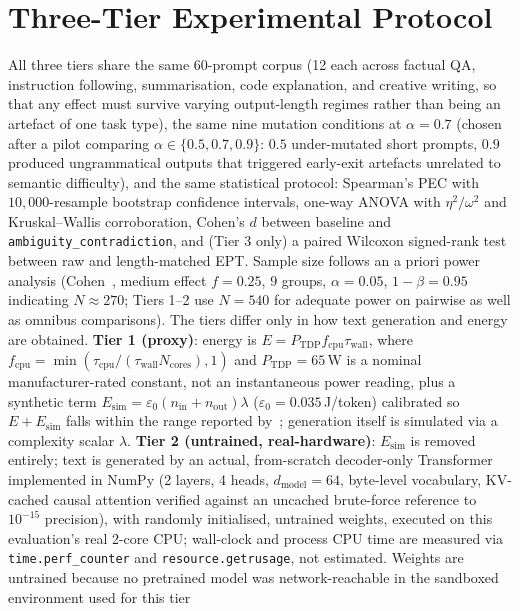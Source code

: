 \documentclass[conference]{IEEEtran}
\begin{document}
\section{Three-Tier Experimental Protocol}
\label{sec:protocol}
All three tiers share the same 60-prompt corpus (12 each across
factual QA, instruction following, summarisation, code explanation,
and creative writing, so that any effect must survive varying
output-length regimes rather than being an artefact of one task type),
the same nine mutation conditions at $\alpha=0.7$ (chosen after a
pilot comparing $\alpha\in\{0.5,0.7,0.9\}$: $0.5$ under-mutated short
prompts, $0.9$ produced ungrammatical outputs that triggered early-exit
artefacts unrelated to semantic difficulty), and the same statistical
protocol: Spearman's PEC with $10{,}000$-resample bootstrap confidence
intervals, one-way ANOVA with $\eta^2/\omega^2$ and Kruskal--Wallis
corroboration, Cohen's $d$ between baseline and
\texttt{ambiguity\_contradiction}, and (Tier 3 only) a paired Wilcoxon
signed-rank test between raw and length-matched EPT. Sample size
follows an a priori power analysis (Cohen~\cite{cohen1988statistical},
medium effect $f=0.25$, 9 groups, $\alpha=0.05$, $1-\beta=0.95$
indicating $N\approx270$; Tiers 1--2 use $N=540$ for adequate power on
pairwise as well as omnibus comparisons).
The tiers differ only in how text generation and energy are obtained.
\textbf{Tier 1 (proxy)}: energy is $E=P_\text{TDP}f_\text{cpu}
\tau_\text{wall}$, where $f_\text{cpu}=\min(\tau_\text{cpu}/
(\tau_\text{wall}N_\text{cores}),1)$ and $P_\text{TDP}=65$\,W is a
nominal manufacturer-rated constant, not an instantaneous power
reading, plus a synthetic term $E_\text{sim}=\varepsilon_0(n_\text{in}
+n_\text{out})\lambda$ ($\varepsilon_0=0.035$\,J/token) calibrated so
$E+E_\text{sim}$ falls within the range reported
by~\cite{samsi2023words,faiz2024llmcarbon}; generation itself is
simulated via a complexity scalar $\lambda$. \textbf{Tier 2 (untrained,
real-hardware)}: $E_\text{sim}$ is removed entirely; text is generated
by an actual, from-scratch decoder-only Transformer implemented in
NumPy (2 layers, 4 heads, $d_\text{model}=64$, byte-level vocabulary,
KV-cached causal attention verified against an uncached
brute-force reference to $10^{-15}$ precision), with randomly
initialised, untrained weights, executed on this evaluation's real
2-core CPU; wall-clock and process CPU time are measured via
\texttt{time.perf\_counter} and \texttt{resource.getrusage}, not
estimated. Weights are untrained because no pretrained model was
network-reachable in the sandboxed environment used for this tier
\end{document}
